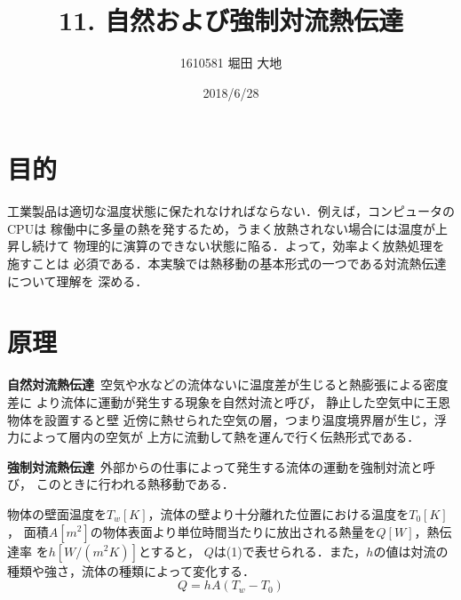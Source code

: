 \documentclass[twocolumn, 10pt,a4j]{jsarticle}
\title{\vspace{-2.5cm}11. 自然および強制対流熱伝達}
\author{1610581 堀田 大地}
\date{2018/6/28}
\begin{document}
\maketitle{}
\section{目的}
  工業製品は適切な温度状態に保たれなければならない．例えば，コンピュータのCPUは
  稼働中に多量の熱を発するため，うまく放熱されない場合には温度が上昇し続けて
  物理的に演算のできない状態に陥る．よって，効率よく放熱処理を施すことは
  必須である．本実験では熱移動の基本形式の一つである対流熱伝達について理解を
  深める．
\section{原理}
    {\bf 自然対流熱伝達}\ 空気や水などの流体ないに温度差が生じると熱膨張による密度差に
  より流体に運動が発生する現象を自然対流と呼び，
  静止した空気中に王恩物体を設置すると壁
  近傍に熱せられた空気の層，つまり温度境界層が生じ，浮力によって層内の空気が
  上方に流動して熱を運んで行く伝熱形式である．
    \par{\bf 強制対流熱伝達}\ 外部からの仕事によって発生する流体の運動を強制対流と呼び，
  このときに行われる熱移動である．
  \\[1ex]\par
    物体の壁面温度を$T_{w}[K]$，流体の壁より十分離れた位置における温度を$T_{0}[K]$，
  面積$A[m^{2}]$の物体表面より単位時間当たりに放出される熱量を$Q[W]$，熱伝達率
  を$h[W/(m^{2}K)]$とすると，
  $Q$は(1)で表せられる．また，$h$の値は対流の種類や強さ，流体の種類によって変化する．
  \begin{equation}
    Q = hA(T_{w} - T_{0})
  \end{equation}
\end{document}
